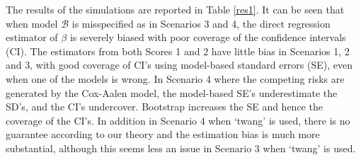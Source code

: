 \documentclass[11pt]{article}
\begin{document}

The results of the simulations are reported in Table \ref{res1}. 
It can be seen that when model $\mathcal{B}$ is misspecified as in Scenarios 3 and 4, the direct regression estimator of $\beta$ is severely biased with poor coverage of the confidence intervals (CI).
The estimators from both Scores 1 and 2 have little bias  in Scenarios 1, 2 and 3, 
with good coverage of CI's  using model-based standard errors (SE), even when one of the models is wrong.
In Scenario 4 where the competing risks are generated by the Cox-Aalen model, the model-based SE's underestimate the SD's, and the CI's undercover. 
Bootstrap increases the SE and hence the coverage of the CI's. 
In addition  in Scenario 4 when `twang' is used, there is no guarantee according to 
 our theory %
and the estimation bias is much more substantial, although this seems less an issue in Scenario 3 when `twang' is used. 
\end{document}
